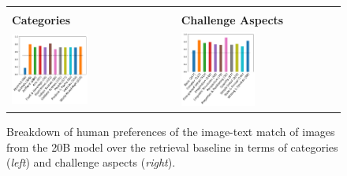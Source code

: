 \begin{figure}[t]
    \centering
    \footnotesize
    \setlength\tabcolsep{2pt}
    \begin{tabular}{>{\centering\arraybackslash}p{}>{\centering\arraybackslash}p{}}
        \multicolumn{2}{c}{\textbf{Image-Text Match (\bdraw 20B vs. Retrieval)}} \\
        \textbf{Categories} & \textbf{Challenge Aspects} \\
        \vspace{-0.1in}\includegraphics[width=0.48\textwidth]{figures/bcp_charts/bcp_20b_retrieval_breakdown_category_language.pdf} &
        \vspace{-0.1in}\includegraphics[width=0.48\textwidth]{figures/bcp_charts/bcp_20b_retrieval_breakdown_complexity_language.pdf} \vspace{1mm} \\
    \end{tabular} 
    \caption{
    Breakdown of human preferences of the image-text match of images from the \bdraw 20B model over the retrieval baseline in terms of \bcpa{} categories ({\it left}) and challenge aspects ({\it right}).}
    \label{figs:bcp_retrieval_lang_breakdown}
\end{figure}


